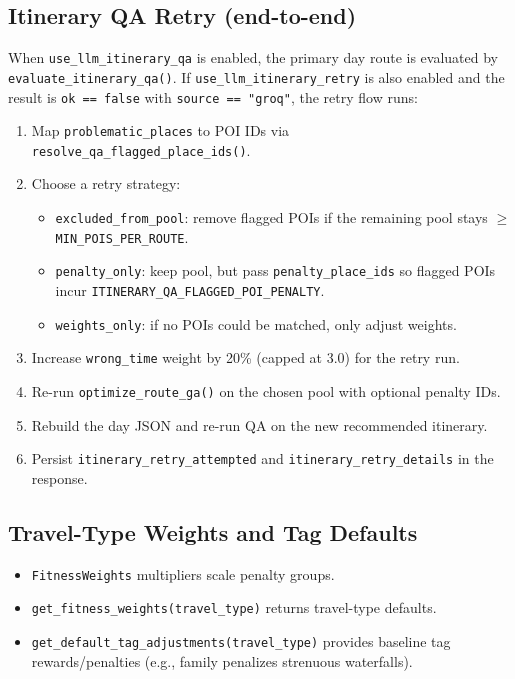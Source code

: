 \documentclass[11pt]{article}
\begin{document}
\subsection{Itinerary QA Retry (end-to-end)}
When \texttt{use\_llm\_itinerary\_qa} is enabled, the primary day route is evaluated by \texttt{evaluate\_itinerary\_qa()}.
If \texttt{use\_llm\_itinerary\_retry} is also enabled and the result is \texttt{ok == false} with \texttt{source == "groq"}, the retry flow runs:
\begin{enumerate}
  \item Map \texttt{problematic\_places} to POI IDs via \texttt{resolve\_qa\_flagged\_place\_ids()}.
  \item Choose a retry strategy:
  \begin{itemize}
    \item \texttt{excluded\_from\_pool}: remove flagged POIs if the remaining pool stays $\geq$ \texttt{MIN\_POIS\_PER\_ROUTE}.
    \item \texttt{penalty\_only}: keep pool, but pass \texttt{penalty\_place\_ids} so flagged POIs incur \texttt{ITINERARY\_QA\_FLAGGED\_POI\_PENALTY}.
    \item \texttt{weights\_only}: if no POIs could be matched, only adjust weights.
  \end{itemize}
  \item Increase \texttt{wrong\_time} weight by 20\% (capped at 3.0) for the retry run.
  \item Re-run \texttt{optimize\_route\_ga()} on the chosen pool with optional penalty IDs.
  \item Rebuild the day JSON and re-run QA on the new recommended itinerary.
  \item Persist \texttt{itinerary\_retry\_attempted} and \texttt{itinerary\_retry\_details} in the response.
\end{enumerate}

\subsection{Travel-Type Weights and Tag Defaults}
\begin{itemize}
  \item \texttt{FitnessWeights} multipliers scale penalty groups.
  \item \texttt{get\_fitness\_weights(travel\_type)} returns travel-type defaults.
  \item \texttt{get\_default\_tag\_adjustments(travel\_type)} provides baseline tag rewards/penalties (e.g., family penalizes strenuous waterfalls).
\end{itemize}
\end{document}
